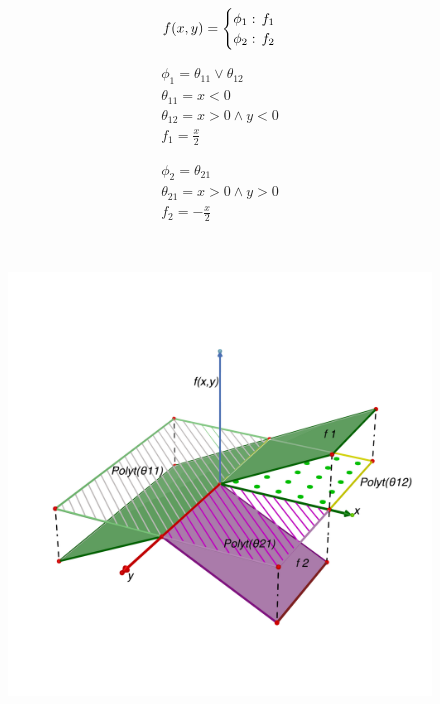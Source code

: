 \vspace{-5mm}
\begin{figure}[t!]
\begin{minipage}{0.15\textwidth}
{\scriptsize
\begin{align*}
f(x,y)= 
\begin{cases}
  \phi_1:& \hspace{-2mm} f_1\\ 
  \phi_2: & \hspace{-2mm}f_2\\ 
\end{cases}
\end{align*} }
\end{minipage}
\begin{minipage}{0.15\textwidth}
{\scriptsize
\begin{align*}
 \phi_1 = \theta_{11}\vee \theta_{12}\\
\theta_{11} = x<0 \\
\theta_{12} = x>0 \wedge y<0 \\
 f_1 = \displaystyle \frac{x}{2} 
\end{align*} }
\end{minipage}
\begin{minipage}{0.15\textwidth}
{\scriptsize
\begin{align*}
\phi_2 = \theta_{21}\\
\theta_{21} = x>0 \wedge y>0\\
f_2 = \displaystyle -\frac{x}{2}
\end{align*} }
\end{minipage}\\
\begin{minipage}{0.3\textwidth}
\center
\vspace{-13mm}
\includegraphics[trim = 1cm 0cm 1cm 0cm,width=\textwidth]{Figures/stepfun/PiecewiseLinearEx.pdf} 

\end{minipage}
\end{figure}
